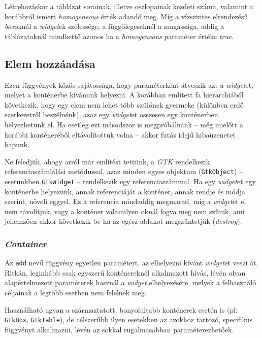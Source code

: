 \documentclass[a4paper,10pt]{article}
\begin{document}
Létrehozáskor a táblázat sorainak, illetve oszlopainak kezdeti száma, valamint a korábbról ismert \textit{homogeneous} érték adandó meg. Míg a vízszintes elrendezésű \textit{box}oknál a \textit{widget}ek szélessége, a függőlegeseknél a magassága, addig a táblázatoknál mindkettő azonos ha a \textit{homogeneous} paraméter értéke \textit{true}.

\subsection{Elem hozzáadása}

Ezen függvények közös sajátossága, hogy paraméterként átveszik azt a \textit{widget}et, melyet a konténerbe kívánunk helyezni. A korábban említett fa hierarchiából következik, hogy egy elem nem lehet több szülőnek gyermeke (különben erdő szerkezetről beszélnénk), azaz egy \textit{widget}et összesen egy konténerben helyezhetünk el. Ha esetleg ezt másodszor is megpróbálnánk -- még mielőtt a korábbi konténeréből eltávolítottuk volna -- akkor futás idejű hibaüzenetet kapunk.

Ne feledjük, ahogy arról már említést tettünk, a \textit{GTK} rendelkezik referenciaszámlálási metódussal, azaz minden egyes objektum (\texttt{GtkObject}) -- esetünkben \texttt{GtkWidget} -- rendelkezik egy referenciaszámmal. Ha egy \textit{widget}et egy konténerbe helyezünk, annak referenciáját a konténer, annak rendje és módja szerint, növeli eggyel. Ez a referencia mindaddig megmarad, míg a \textit{widget}et el nem távolítjuk, vagy a konténer valamilyen oknál fogva meg nem szűnik, ami jellemzően akkor következik be ha az egész ablakot megszüntetjük (\textit{destroy}).

\subsubsection{\textit{Container}}

Az \texttt{add} nevű függvény egyetlen paramétert, az elhelyezni kívánt \textit{widget}et veszi át. Ritkán, leginkább csak egyszerű konténereknél alkalmazott hívás, lévén olyan alapértelmezett paraméterek használ a \textit{widget} elhelyezésére, melyek a felhasználó céljainak a legtöbb esetben nem felelnek meg.

Használható ugyan a származtatott, bonyolultabb konténerek esetén is (pl: \texttt{GtkBox}, \texttt{GtkTable}), de célszerűbb ilyen esetekben az azokhoz tartozó, specifikus függvényt alkalmazni, lévén az sokkal rugalmasabban paraméterezhetőek.
\end{document}
